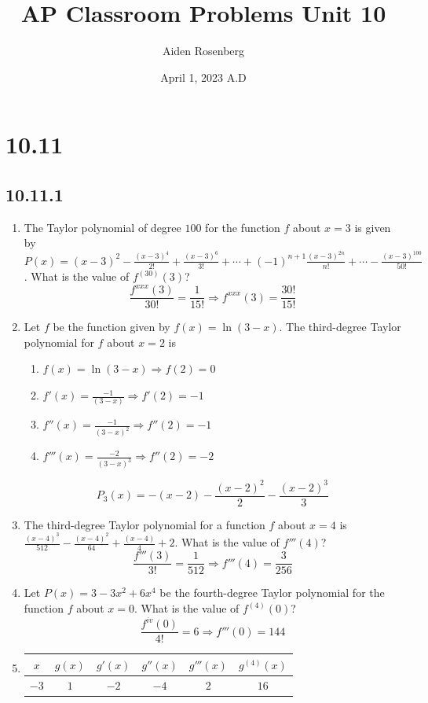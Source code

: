 \documentclass[12pt]{article}
\title{AP Classroom Problems Unit 10}
\author{Aiden Rosenberg}
\date{April 1, 2023 A.D}
\begin{document}
\maketitle
\section*{10.11}
\subsection*{10.11.1}
\begin{enumerate}
	\item The Taylor polynomial of degree $100$ for the function $f$ about $x = 3$ is given by $P(x)=(x-3)^2 - \frac{(x-3)^4}{2!} + \frac{(x-3)^6}{3!} + \cdots + (-1)^{n+1} \frac{(x-3)^{2n}}{n!} + \cdots - \frac{(x-3)^{100}}{50!}$. What is the value of $f^{(30)}(3)$?
	      $$\frac{f^{xxx}(3)}{30!} = \frac{1}{15!} \Longrightarrow \boxed{f^{xxx}(3) = \frac{30!}{15!}}$$
	\item Let $f$ be the function given by $f(x)=\ln(3-x)$. The third-degree Taylor polynomial for $f$ about $x=2$ is
	      \begin{enumerate}
	      	\item $f(x) = \ln(3-x) \Longrightarrow f(2) = 0$
	      	\item $f'(x) = \frac{-1}{(3-x)} \Longrightarrow f'(2) = -1$
	      	\item $f''(x) = \frac{-1}{(3-x)^2} \Longrightarrow f''(2) = -1$
	      	\item $f'''(x) = \frac{-2}{(3-x)^3} \Longrightarrow f''(2) = -2$
	      \end{enumerate}
	      $$\boxed{P_3(x) = -(x-2) - \frac{(x-2)^2}{2}-\frac{(x-2)^3}{3}}$$
	\item The third-degree Taylor polynomial for a function $f$ about $x=4$ is $\frac{(x-4)^3}{512} - \frac{(x-4)^2}{64} + \frac{(x-4)}{4} + 2$. What is the value of $f'''(4)$?
	      $$\frac{f'''(3)}{3!} = \frac{1}{512} \Longrightarrow \boxed{f'''(4) = \frac{3}{256}}$$
	\item Let $P(x)=3-3x^2+6x^4$ be the fourth-degree Taylor polynomial for the function $f$ about $x=0$. What is the value of $f^{(4)}(0)$?
	      $$\frac{f^{iv}(0)}{4!} = 6 \Longrightarrow \boxed{f'''(0) = 144}$$
	\item
	      \begin{table}[h]
	      	\centering
	      	\begin{tabular}{|c||c|c|c|c|c|}
	      		\hline
	      		$x$  & $g(x)$ & $g'(x)$ & $g''(x)$ & $g'''(x)$ & $g^{(4)}(x)$ \\ \hline
	      		$-3$ & $1$    & $-2$    & $-4$     & $2$       & $16$         \\ \hline
	      	\end{tabular}
	      \end{table}
	          

\end{enumerate}
\end{document}

